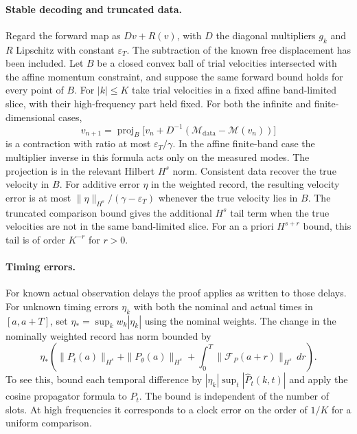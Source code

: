 \paragraph{Stable decoding and truncated data.}
Regard the forward map as $D v+R(v)$, with $D$ the
diagonal multipliers $g_k$ and $R$ Lipschitz with
constant $\varepsilon_T$. The subtraction of the known
free displacement has been included. Let $B$ be a closed
convex ball of trial velocities intersected with the
affine momentum constraint, and suppose the same forward
bound holds for every point of $B$.
For $|k|\le K$ take trial velocities in a fixed affine
band-limited slice, with their high-frequency part held fixed.
For both the infinite and finite-dimensional cases,
\[
 v_{n+1}=\operatorname{proj}_{B}
 \big[v_n+D^{-1}(\mathcal M_{\mathrm{data}}-\mathcal M(v_n))\big]
\]
is a contraction with ratio at most $\varepsilon_T/\gamma$.
In the affine finite-band case the multiplier inverse in
this formula acts only on the measured modes.
The projection is in the relevant Hilbert $H^s$ norm.
Consistent data recover the true velocity in $B$.
For additive error $\eta$ in the weighted record, the
resulting velocity error is at most
$\|\eta\|_{H^s}/(\gamma-\varepsilon_T)$ whenever the
true velocity lies in $B$. The truncated comparison
bound gives the additional $H^s$ tail term when the
true velocities are not in the same band-limited slice.
For an a priori $H^{s+r}$ bound, this tail is of order
$K^{-r}$ for $r>0$.

\paragraph{Timing errors.}
For known actual observation delays the proof applies
as written to those delays. For unknown timing errors
$\eta_k$ with both the nominal and actual times in
$[a,a+T]$, set $\eta_*=\sup_k w_k|\eta_k|$ using the
nominal weights. The change in the nominally weighted
record has norm bounded by
\[
 \eta_*\left(\|P_t(a)\|_{H^s}+\|P_\theta(a)\|_{H^s}
           +\int_0^T\|\mathcal F_P(a+r)\|_{H^s}\,dr\right).
\]
To see this, bound each temporal difference by
$|\eta_k|\sup_t|\widehat P_t(k,t)|$ and apply the
cosine propagator formula to $P_t$.
The bound is independent of the number of slots.
At high frequencies it corresponds to a clock error
on the order of $1/K$ for a uniform comparison.

